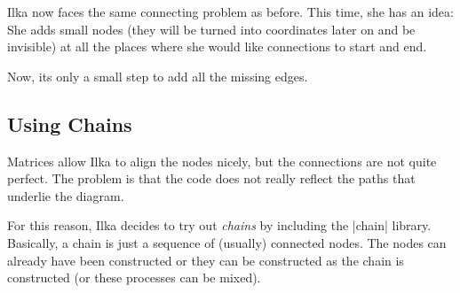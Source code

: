 Ilka now faces the same connecting problem as before. This time, she
has an idea: She adds small nodes (they will be turned into
coordinates later on and be invisible) at all the places
where she would like connections to start and end.
\begin{codeexample}[]
\end{codeexample}
Now, its only a small step to add all the missing edges.



\subsection{Using Chains}

Matrices allow Ilka to align the nodes nicely, but the connections are
not quite perfect. The problem is that the code does not really
reflect the paths that underlie the diagram.


For this reason, Ilka decides to try out \emph{chains} by including
the |chain| library. Basically, a chain is just a sequence of
(usually) connected nodes. The nodes can already have been constructed
or they can be constructed as the chain is constructed (or these
processes can be mixed).

